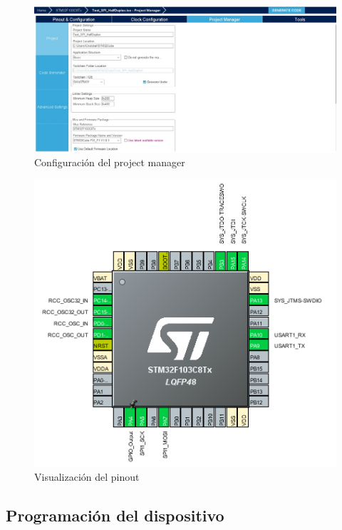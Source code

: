 \documentclass[10pt,a4paper,oneside]{article}
\begin{document}
\begin{figure}[H]
\centering
\includegraphics[scale=0.4]{Imagenes/Manager_Settings.jpg}
\caption[Configuración del project manager]{Configuración del project manager}
\label{fig:012}
\end{figure}


\begin{figure}[H]
\centering
\includegraphics[scale=1]{Imagenes/PINOUT.png}
\caption[Visualización del pinout]{Visualización del pinout}
\label{fig:013}
\end{figure}

\subsection{Programación del dispositivo}%


\bigskip
\end{document}
